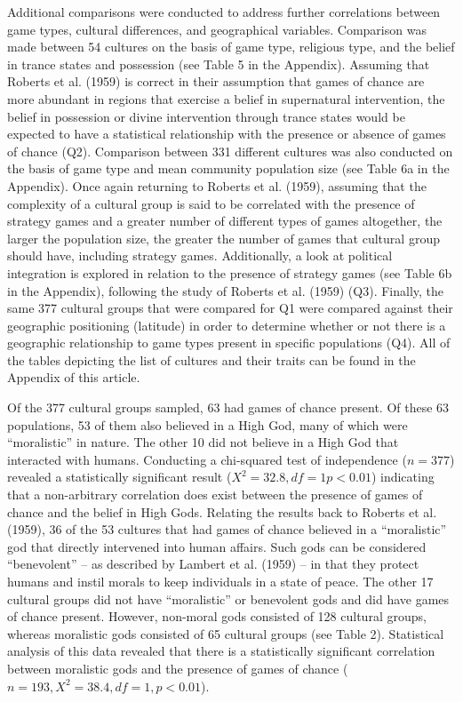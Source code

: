 \documentclass[%
	]{ijsra}
\begin{document}
Additional comparisons were conducted to address further correlations between game types, cultural differences, and geographical variables. Comparison was made between 54 cultures on the basis of game type, religious type, and the belief in trance states and possession (see Table 5 in the Appendix). Assuming that Roberts et al. (1959) is correct in their assumption that games of chance are more abundant in regions that exercise a belief in supernatural intervention, the belief in possession or divine intervention through trance states would be expected to have a statistical relationship with the presence or absence of games of chance (Q2). Comparison between 331 different cultures was also conducted on the basis of game type and mean community population size (see Table 6a in the Appendix). Once again returning to Roberts et al. (1959), assuming that the complexity of a cultural group is said to be correlated with the presence of strategy games and a greater number of different types of games altogether, the larger the population size, the greater the number of games that cultural group should have, including strategy games. Additionally, a look at political integration is explored in relation to the presence of strategy games (see Table 6b in the Appendix), following the study of Roberts et al. (1959) (Q3). Finally, the same 377 cultural groups that were compared for Q1 were compared against their geographic positioning (latitude) in order to determine whether or not there is a geographic relationship to game types present in specific populations (Q4).%
 All of the tables depicting the list of cultures and their traits can be found in the Appendix of this article.



Of the 377 cultural groups sampled, 63 had games of chance present. Of these 63 populations, 53 of them also believed in a High God, many of which were “moralistic” in nature. The other 10 did not believe in a High God that interacted with humans. Conducting a chi-squared test of independence ($n = 377$) revealed a statistically significant result ($Χ^{2} = 32.8, df = 1 p < 0.01$) indicating that a non-arbitrary correlation does exist between the presence of games of chance and the belief in High Gods. Relating the results back to Roberts et al. (1959), 36 of the 53 cultures that had games of chance believed in a “moralistic” god that directly intervened into human affairs. Such gods can be considered “benevolent” – as described by Lambert et al. (1959) – in that they protect humans and instil morals to keep individuals in a state of peace. The other 17 cultural groups did not have “moralistic” or benevolent gods and did have games of chance present. However, non-moral gods consisted of 128 cultural groups, whereas moralistic gods consisted of 65 cultural groups (see Table 2). Statistical analysis of this data revealed that there is a statistically significant correlation between moralistic gods and the presence of games of chance ($n = 193, Χ^{2} = 38.4, df = 1, p < 0.01$).
\end{document}
